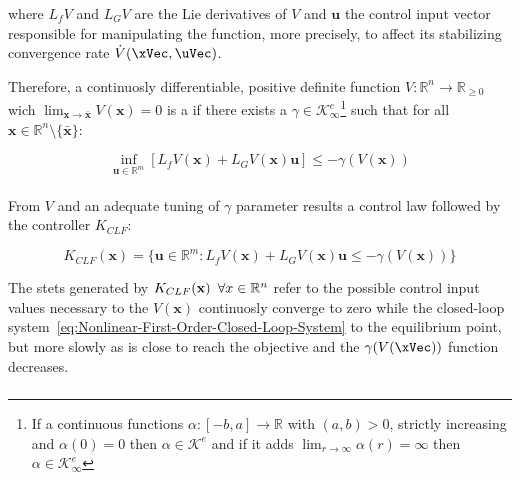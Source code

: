 where \(L_fV\) and \(L_GV\) are the Lie derivatives of \(V\) and \(\mathbf{u}\) the control input vector responsible for manipulating the function, more precisely, to affect its stabilizing convergence rate \(\dot{V}(\xVec, \uVec)\).\par

Therefore, a continuosly differentiable, positive definite function \( V: \mathbb{R}^n \rightarrow \mathbb{R}_{\geq 0}  \) wich \( \lim_{\mathbf{x} \to \bar{\mathbf{x}}}{V(\mathbf{x})} = 0 \) is a  if there exists a \( \gamma \in \mathcal{K}^e_{\infty}  \)\footnote{If a continuous functions \(\alpha:[-b,a] \to \mathbb{R}\) with \((a,b) > 0\), strictly increasing and \(\alpha(0) = 0\) then \(\alpha \in \mathcal{K}^e\) and if it adds \(\lim_{r \to \infty} \alpha(r) = \infty\) then \(\alpha \in \mathcal{K}^e_{\infty}\)}  such that for all \( \mathbf{x} \in \mathbb{R}^n \setminus \{\bar{\mathbf{x}}\} \):

\begin{equation}
 \inf_{\mathbf{u} \in \mathbb{R}^m} [L_fV(\mathbf{x}) + L_GV(\mathbf{x})\mathbf{u}] \leq -\gamma(V(\mathbf{x}))
 \label{eq:CLF}
\end{equation}\\

From  \(V\) and an adequate tuning of \( \gamma \) parameter results a control law followed by the controller \(K_{CLF}\):

\begin{equation}
 K_{CLF}(\mathbf{x}) = \{ \mathbf{u} \in \mathbb{R}^m: L_fV(\mathbf{x}) + L_GV(\mathbf{x})\mathbf{u} \leq -\gamma(V(\mathbf{x})) \}
 \label{eq:K-CLF}
\end{equation}

The stets generated by \(K_{CLF}(\mathbf{x}) \hspace{0.5em} \forall x \in \mathbb{R}^n \) refer to the possible control input values necessary to the  \(V(\mathbf{x})\) continuosly converge to zero while the closed-loop system~\ref{eq:Nonlinear-First-Order-Closed-Loop-System} to the equilibrium point, but more slowly as is close to reach the objective and the \(\gamma(V(\xVec))\) function decreases. \\


\subsubsection{}
\label{subsub:control_barrier_function}

